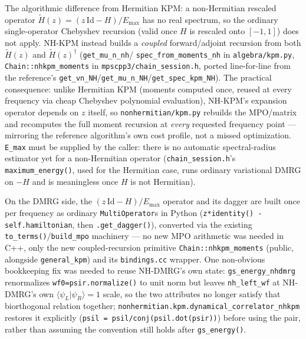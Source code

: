 \documentclass[11pt]{article}
\begin{document}
The algorithmic difference from Hermitian KPM: a non-Hermitian rescaled
operator $\tilde H(z)=(z\,\mathrm{Id}-H)/E_{\max}$ has no real spectrum,
so the ordinary single-operator Chebyshev recursion (valid once $H$ is
rescaled onto $[-1,1]$) does not apply. NH-KPM instead builds a
\emph{coupled} forward/adjoint recursion from both $\tilde H(z)$ and
$\tilde H(z)^\dagger$ (\texttt{get\_mu\_n\_nh}/
\texttt{spec\_from\_moments\_nh} in \texttt{algebra/kpm.py},
\texttt{Chain::nhkpm\_moments} in \texttt{mpscpp3/chain\_session.h},
ported line-for-line from the reference's
\texttt{get\_vn\_NH}/\texttt{get\_mu\_n\_NH}/\texttt{get\_spec\_kpm\_NH}).
The practical consequence: unlike Hermitian KPM (moments computed once,
reused at every frequency via cheap Chebyshev polynomial evaluation),
NH-KPM's expansion operator depends on $z$ itself, so
\texttt{nonhermitian/kpm.py} rebuilds the MPO/matrix and recomputes the
full moment recursion at \emph{every} requested frequency point ---
mirroring the reference algorithm's own cost profile, not a missed
optimization. \texttt{E\_max} must be supplied by the caller: there is
no automatic spectral-radius estimator yet for a non-Hermitian operator
(\texttt{chain\_session.h}'s \texttt{maximum\_energy()}, used for the
Hermitian case, runs ordinary variational DMRG on $-H$ and is
meaningless once $H$ is not Hermitian).

On the DMRG side, the $(z\,\mathrm{Id}-H)/E_{\max}$ operator and its
dagger are built once per frequency as ordinary \texttt{MultiOperator}s
in Python (\texttt{z*identity() - self.hamiltonian}, then
\texttt{.get\_dagger()}), converted via the existing
\texttt{to\_terms()}/\texttt{build\_mpo} machinery --- no new MPO
arithmetic was needed in C++, only the new coupled-recursion primitive
\texttt{Chain::nhkpm\_moments} (public, alongside \texttt{general\_kpm})
and its \texttt{bindings.cc} wrapper. One non-obvious bookkeeping fix was
needed to reuse NH-DMRG's own state: \texttt{gs\_energy\_nhdmrg}
renormalizes \texttt{wf0=psir.normalize()} to unit norm but leaves
\texttt{nh\_left\_wf} at NH-DMRG's own $\langle\psi_L|\psi_R\rangle=1$
scale, so the two attributes no longer satisfy that biorthogonal
relation together; \texttt{nonhermitian.kpm.dynamical\_correlator\_nhkpm}
restores it explicitly
(\texttt{psil = psil/conj(psil.dot(psir))}) before using the pair,
rather than assuming the convention still holds after
\texttt{gs\_energy()}.
\end{document}
